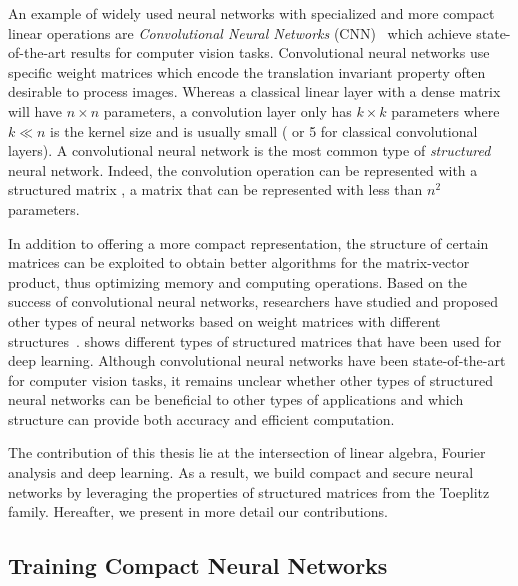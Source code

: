An example of widely used neural networks with specialized and more compact linear operations are \emph{Convolutional Neural Networks} (CNN)~\cite{lecun1998gradient,krizhevsky2012imagenet,he2016deep,tan2019efficientnet} which achieve state-of-the-art results for computer vision tasks.
Convolutional neural networks use specific weight matrices which encode the translation invariant property often desirable to process images.
Whereas a classical linear layer with a dense matrix will have $n \times n$ parameters, a convolution layer only has $k \times k$ parameters where $k \ll n$ is the kernel size and is usually small ( or 5 for classical convolutional layers).
A convolutional neural network is the most common type of \emph{structured} neural network.
Indeed, the convolution operation can be represented with a structured matrix \ie, a matrix that can be represented with less than $n^2$ parameters.


In addition to offering a more compact representation, the structure of certain matrices can be exploited to obtain better algorithms for the matrix-vector product, thus optimizing memory and computing operations.
Based on the success of convolutional neural networks, researchers have studied and proposed other types of neural networks based on weight matrices with different structures~\cite{moczulski2016acdc,sindhwani2015structured,denil2013predicting}.
 shows different types of structured matrices that have been used for deep learning.
Although convolutional neural networks have been state-of-the-art for computer vision tasks, it remains unclear whether other types of structured neural networks can be beneficial to other types of applications and which structure can provide both accuracy and efficient computation.

The contribution of this thesis lie at the intersection of linear algebra, Fourier analysis and deep learning.
As a result, we build compact and secure neural networks by leveraging the properties of structured matrices from the Toeplitz family.
Hereafter, we present in more detail our contributions.

\subsection{Training Compact Neural Networks}
\label{subsection:ch1-training_compact_neural_networks}


